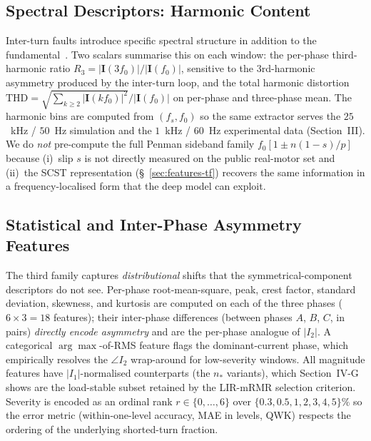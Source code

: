 \documentclass[journal]{IEEEtran}
\begin{document}
\subsection{Spectral Descriptors: Harmonic Content}
\label{sec:features-spectral}
Inter-turn faults introduce specific spectral structure in addition to the
fundamental~\cite{penman1994}. Two scalars summarise this on each window: the per-phase
third-harmonic ratio $R_3 = |\mathbf{I}(3f_0)| / |\mathbf{I}(f_0)|$, sensitive to the
$3$rd-harmonic asymmetry produced by the inter-turn loop, and the total harmonic
distortion $\mathrm{THD} = \sqrt{\sum_{k\geq 2} |\mathbf{I}(kf_0)|^2}/|\mathbf{I}(f_0)|$
on per-phase and three-phase mean. The harmonic bins are computed from $(f_s, f_0)$ so
the same extractor serves the $25$~kHz / $50$~Hz simulation and the $1$~kHz / $60$~Hz
experimental data (Section~III). We do \emph{not} pre-compute the full Penman sideband
family $f_0[1\!\pm\!n(1\!-\!s)/p]$~\cite{penman1994} because (i)~slip $s$ is not directly
measured on the public real-motor set and (ii)~the SCST representation
(\S~\ref{sec:features-tf}) recovers the same information in a frequency-localised form
that the deep model can exploit.

\subsection{Statistical and Inter-Phase Asymmetry Features}
\label{sec:features-stats}
The third family captures \emph{distributional} shifts that the symmetrical-component
descriptors do not see. Per-phase root-mean-square, peak, crest factor, standard deviation,
skewness, and kurtosis are computed on each of the three phases ($6\!\times\!3 = 18$
features); their inter-phase differences (between phases $A$, $B$, $C$, in pairs)
\emph{directly encode asymmetry} and are the per-phase analogue of $|I_2|$. A categorical
$\arg\max$-of-RMS feature flags the dominant-current phase, which empirically resolves the
$\angle I_2$ wrap-around for low-severity windows. All magnitude features have
$|I_1|$-normalised counterparts (the $n_{\!*}$ variants), which Section~IV-G shows are the
load-stable subset retained by the LIR-mRMR selection criterion. Severity is encoded as an
ordinal rank $r\in\{0,\dots,6\}$ over $\{0.3,0.5,1,2,3,4,5\}\%$ so the error metric
(within-one-level accuracy, MAE in levels, QWK) respects the ordering of the underlying
shorted-turn fraction.
\end{document}
